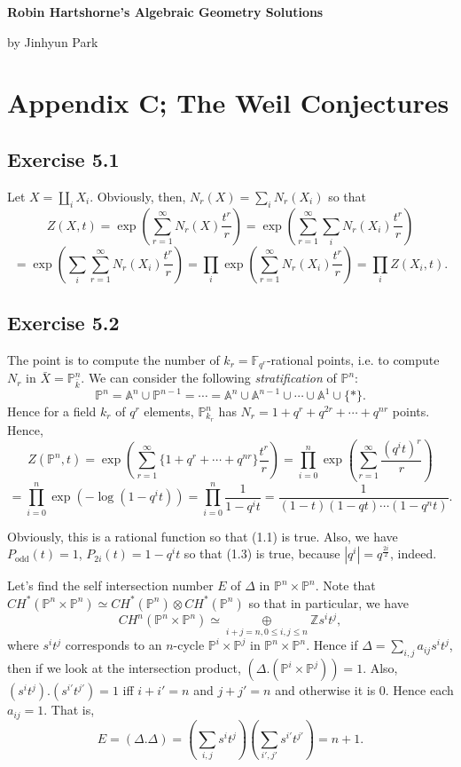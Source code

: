 \documentclass[11pt]{amsart}          %
\newcommand{\bbZ}{\mathbb{Z}}
\newcommand{\bbP}{\mathbb{P}}
\newcommand{\bbA}{\mathbb{A}}
\newcommand{\bbF}{\mathbb{F}}
\begin{document}
\begin{center}
\bf
\large Robin Hartshorne's Algebraic Geometry Solutions\\
\end{center}
\begin{center}
by Jinhyun Park
\end{center}
\vskip0.5cm
\section*{Appendix C; The Weil Conjectures}
\subsection*{Exercise 5.1} Let $X= \coprod_i X_i$. Obviously, then, $N_r(X) = \sum_i N_r(X_i)$ so that
$$Z(X, t) = \exp(\sum_{r=1} ^{\infty} N_r(X) \frac{t^r}{r}) = \exp(\sum_{r=1} ^{\infty} \sum_i N_r (X_i) \frac{t^r}{r})$$
$$= \exp(\sum_i \sum_{r=1} ^{\infty} N_r (X_i) \frac{t^r}{r}) = \prod_i \exp (\sum_{r=1} ^{\infty} N_r(X_i) \frac{t^r}{r}) = \prod_i Z(X_i, t).$$

\subsection*{Exercise 5.2} The point is to compute the number of $k_r = \bbF_{q^r}$-rational points, i.e. to compute $N_r$ in $\bar{X} = \bbP_{\bar{k}} ^n$. We can consider the following {\it stratification} of $\bbP^n$:
$$\bbP^n = \bbA^n \cup \bbP^{n-1} = \cdots = \bbA^n \cup \bbA^{n-1} \cup \cdots \cup \bbA^1 \cup \{ * \}.$$ Hence for a field $k_r$ of $q^r$ elements, $\bbP_{k_r} ^n$ has $N_r = 1+ q^r + q^{2r} + \cdots + q^{nr}$ points. Hence,
$$Z(\bbP^n, t) = \exp(\sum_{r=1} ^{\infty} \{ 1+ q^r + \cdots + q^{nr} \} \frac{t^r}{r}) = \prod_{i=0} ^n \exp (\sum_{r=1} ^{\infty} \frac{(q^i t)^r}{r}) $$
$$= \prod_{i=0} ^n \exp (-\log (1-q^i t)) = \prod_{i=0} ^n \frac{1}{1-q^i t} = \frac{1}{(1-t)(1-qt) \cdots (1-q^nt)}.$$ 

Obviously, this is a rational function so that (1.1) is true. Also, we have $P_{\mbox{odd}} (t) = 1$, $P_{2i} (t) = 1-q^i t$ so that (1.3) is true, because $|q^i | = q^{\frac{2i}{2}}$, indeed.

Let's find the self intersection number $E$ of $\Delta$ in $\bbP^n \times \bbP^n$. Note that $CH^* (\bbP^n \times \bbP^n) \simeq CH^*(\bbP^n) \otimes CH^*(\bbP^n)$ so that in particular, we have
$$CH^n (\bbP^n \times \bbP^n) \simeq \underset{i+j=n, 0\leq i,j \leq n}{\oplus} \bbZ s^i t^j,$$ where $s^i t^j$ corresponds to an $n$-cycle $\bbP^i \times \bbP^j$ in $\bbP^n \times \bbP^n$. Hence if $\Delta = \sum_{i,j} a_{ij} s^i t^j$, then if we look at the intersection product, $(\Delta . (\bbP^i \times \bbP^j)) = 1$. Also, $(s^i t^j) .(s^{i'} t^{j'}) = 1$ iff $i + i' = n$ and $j+ j' = n$ and otherwise it is $0$. Hence each $a_{ij} = 1$. That is, 
$$E = (\Delta . \Delta ) = (\sum_{i,j} s^i t^j) (\sum_{i', j'} s^{i'} t^{j'}) = n+1.$$
\end{document}
